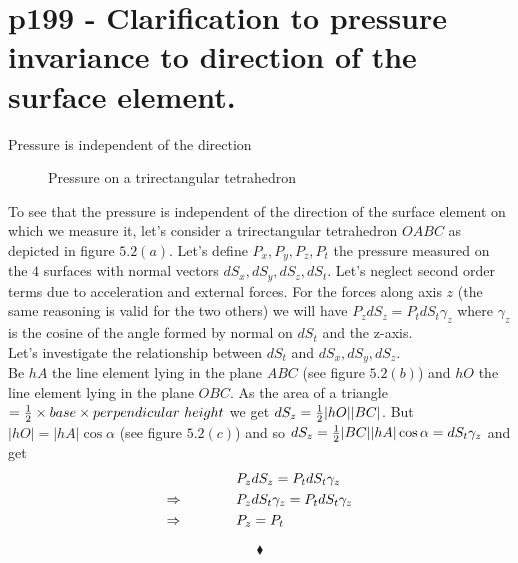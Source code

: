 \section{p199 - Clarification to pressure invariance to direction of the surface element.}
\begin{tcolorbox}
Pressure is independent of the direction
\end{tcolorbox}
\begin{figure}[H]%
    \centering
    \subfloat[]{}
    \quad
        \subfloat[]{}
    \quad
        \subfloat[]{}
    \quad
\caption{Pressure on a trirectangular tetrahedron}
\label{fig:fig_p199}
\end{figure}
To see that the pressure is independent of the direction of the surface element on which we measure it, let's consider a trirectangular tetrahedron $OABC$ as  depicted in figure $5.2(a)$. Let's define $P_x,P_y,P_z, P_t$ the pressure measured on the $4$ surfaces with normal vectors $dS_x,dS_y,dS_z,dS_t$. Let's neglect second order terms due to acceleration and external forces. For the forces along axis $z$ (the same reasoning is valid for the two others) we will have $P_zdS_z= P_tdS_t\gamma_z$ where $\gamma_z$ is the cosine of the angle formed by  normal on $dS_t$ and the z-axis.\\
Let's investigate the relationship between $dS_t$ and $dS_x,dS_y,dS_z$.\\
 Be $hA$ the line element lying in the plane $ABC$ (see figure $5.2(b)$) and $hO$ the line element lying in the plane $OBC$. As the area of a triangle $=\frac{1}{2}\times base \times perpendicular \ height$ we get $dS_z = \frac{1}{2} |hO||BC|$. But $|hO|= |hA|\cos\alpha$  (see figure $5.2(c)$) and so $dS_z = \frac{1}{2} |BC||hA|\cos\alpha = dS_t\gamma_z$
 and get 
\begin{align}
&P_zdS_z= P_tdS_t\gamma_z\\ 
\Rightarrow \quad\quad\quad\quad & P_z dS_t\gamma_z= P_tdS_t\gamma_z\\ 
\Rightarrow \quad\quad\quad\quad & P_z = P_t
\end{align}

 $$\blacklozenge$$
\newpage
